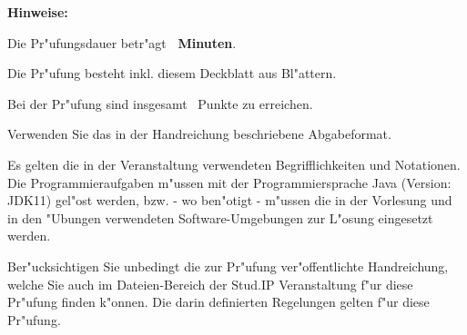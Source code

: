 \textbf{Hinweise:}
\begin{compactitem}
    \item{Die Pr"ufungsdauer betr"agt \textbf{\VariableAmountMinutes~Minuten}}.
    \item{Die Pr"ufung besteht inkl. diesem Deckblatt aus \textbf{\pageref{LastPage}} Bl"attern.}
    \item{Bei der Pr"ufung sind insgesamt \VariableAmountPoints~Punkte zu erreichen.}
    \item{Verwenden Sie das in der Handreichung beschriebene Abgabeformat.}
    \item{Es gelten die in der Veranstaltung verwendeten Begrifflichkeiten und Notationen. Die Programmieraufgaben m"ussen mit der Programmiersprache Java (Version: JDK11) gel"ost werden, bzw. - wo ben"otigt - m"ussen die in der Vorlesung und in den "Ubungen verwendeten Software-Umgebungen zur L"osung eingesetzt werden.}
    \item{Ber"ucksichtigen Sie unbedingt die zur Pr"ufung ver"offentlichte Handreichung, welche Sie
    auch im Dateien-Bereich der Stud.IP Veranstaltung f"ur diese Pr"ufung finden k"onnen. Die
    darin definierten Regelungen gelten f"ur diese Pr"ufung.}
\end{compactitem}